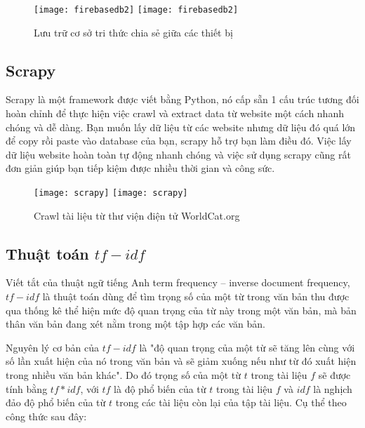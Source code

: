  \begin{figure}[!htbp]
  \begin{center}
    \ifpdf
      \texttt{[image: firebasedb2]}
    \else
      \texttt{[image: firebasedb2]}
    \fi
    \caption{Lưu trữ cơ sở tri thức chia sẻ giữa các thiết bị}
    \label{FirebaseDB2}
  \end{center}
\end{figure}

\subsection{Scrapy}

Scrapy là một framework được viết bằng Python, nó cấp sẵn 1 cấu trúc tương đối hoàn chỉnh để thực hiện việc crawl và extract data từ website một cách nhanh chóng và dễ dàng. Bạn muốn lấy dữ liệu từ các website nhưng dữ liệu đó quá lớn để copy rồi paste vào database của bạn, scrapy hỗ trợ bạn làm điều đó. Việc lấy dữ liệu website hoàn toàn tự động nhanh chóng và việc sử dụng scrapy cũng rất đơn giản giúp bạn tiếp kiệm được nhiều thời gian và công sức.

 \begin{figure}[!htbp]
  \begin{center}
    \ifpdf
      \texttt{[image: scrapy]}
    \else
      \texttt{[image: scrapy]}
    \fi
    \caption{Crawl tài liệu từ thư viện điện tử WorldCat.org }
    \label{Scrapy}
  \end{center}
\end{figure}

\subsection{Thuật toán $tf-idf$}

Viết tắt của thuật ngữ tiếng Anh term frequency – inverse document frequency,$tf-idf$ là thuật toán dùng để tìm trọng số của một từ trong văn bản thu được qua thống kê thể hiện mức độ quan trọng của từ này trong một văn bản, mà bản thân văn bản đang xét nằm trong một tập hợp các văn bản.

Nguyên lý cơ bản của $tf-idf$ là "độ quan trọng của một từ sẽ tăng lên cùng với số lần xuất hiện của nó trong văn bản và sẽ giảm xuống nếu như từ đó xuất hiện trong nhiều văn bản khác". Do đó trọng số của một từ $t$ trong tài liệu $f$ sẽ được tính bằng $tf * idf$, với $tf$ là độ phổ biến của từ $t$ trong tài liệu $f$ và $idf$ là nghịch đảo độ phổ biến của từ $t$ trong các tài liệu còn lại của tập tài liệu. Cụ thể theo công thức sau đây:

